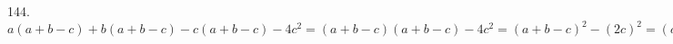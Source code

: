 144. $a(a+b-c)+b(a+b-c)-c(a+b-c)-4c^2=(a+b-c)(a+b-c)-4c^2=(a+b-c)^2-(2c)^2=(a+b-c-2c)(a+b-c+2c)=(a+b-3c)(a+b+c).$\\
